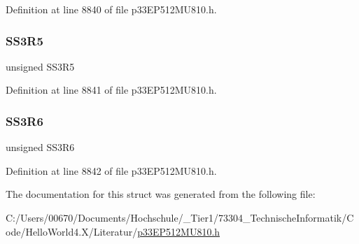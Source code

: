 Definition at line 8840 of file p33\+E\+P512\+M\+U810.\+h.

\mbox{\label{structtag_r_p_i_n_r30_b_i_t_s_ad59276829cb3d4773f704d9e7b0308d3}} 
\subsubsection{\texorpdfstring{S\+S3\+R5}{SS3R5}}
{\footnotesize\ttfamily unsigned S\+S3\+R5}



Definition at line 8841 of file p33\+E\+P512\+M\+U810.\+h.

\mbox{\label{structtag_r_p_i_n_r30_b_i_t_s_ac13dcd3f9c1fc18818e99e50aaa27d6e}} 
\subsubsection{\texorpdfstring{S\+S3\+R6}{SS3R6}}
{\footnotesize\ttfamily unsigned S\+S3\+R6}



Definition at line 8842 of file p33\+E\+P512\+M\+U810.\+h.



The documentation for this struct was generated from the following file\+:\begin{DoxyCompactItemize}
\item 
C\+:/\+Users/00670/\+Documents/\+Hochschule/\+\_\+\+Tier1/73304\+\_\+\+Technische\+Informatik/\+Code/\+Hello\+World4.\+X/\+Literatur/\hyperlink{p33_e_p512_m_u810_8h}{p33\+E\+P512\+M\+U810.\+h}\end{DoxyCompactItemize}
